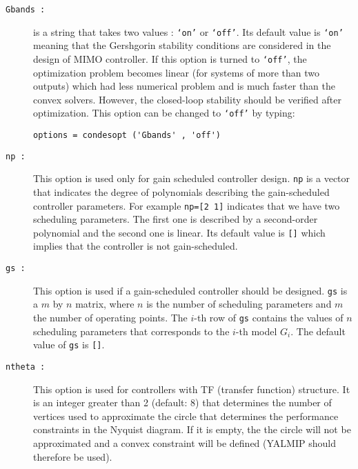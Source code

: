 \documentclass [12pt , a4paper] {report}
\begin{document}
\begin{description}
\item[\texttt{Gbands :}] is a string that takes two values : {\tt `on'} or {\tt `off'}. Its default value is {\tt `on'} meaning that the Gershgorin stability conditions are considered in the design of MIMO controller. If this option is turned to {\tt `off'}, the optimization problem becomes linear (for systems of more than two outputs) which had less numerical problem and is much faster than the convex solvers. However, the closed-loop stability should be verified after optimization. This option can be changed to {\tt `off'} by typing:
\begin{lstlisting}
options = condesopt ('Gbands' , 'off')
\end{lstlisting}


\item[\texttt{np :}] This option is used only for gain scheduled controller design. {\tt np} is a vector that indicates the degree of 
polynomials describing the gain-scheduled controller parameters. For example {\tt np=[2 1]} indicates that we have two scheduling
parameters. The first one is described by a second-order polynomial and the second one is linear. Its default value is \texttt{[]} which implies that the controller is not gain-scheduled.

\item[\texttt{gs :}] This option is used if a gain-scheduled controller should be designed. \texttt{gs} is a $m$ by $n$ matrix, where $n$ is the number 
of scheduling parameters and $m$ the number of operating points. The $i$-th row of {\tt gs} contains the values of $n$ scheduling
parameters that corresponds to the $i$-th model $G_i$. The default value of \texttt{gs} is \texttt{[]}.

\item[\texttt{ntheta :}] This option is used for controllers with TF (transfer
function) structure. It is an integer greater than 2 
(default: 8) that determines the number of vertices used
to approximate the circle that determines the performance
constraints in the Nyquist diagram. If it is empty, the
the circle will not be approximated and a convex constraint
will be defined (YALMIP should therefore be used).



\end{description}
\end{document}
